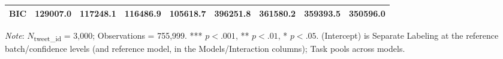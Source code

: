 \documentclass{article}
\begin{document}
\begin{table}
{\begin{tabular}{lcccccccc}
BIC & 129007.0 & 117248.1 & 116486.9 & 105618.7 & 396251.8 & 361580.2 & 359393.5 & 350596.0 \\
\bottomrule
\end{tabular}%
}
\smallskip
\begin{minipage}{\textwidth}
\raggedright
\footnotesize \textit{Note}: $N$\textsubscript{tweet\_id} = 3,000; Observations = 755,999. *** $p<.001$, ** $p<.01$, * $p<.05$. (Intercept) is Separate Labeling at the reference batch/confidence levels (and reference model, in the Models/Interaction columns); Task pools across models.
\end{minipage}
\end{table}
\end{document}

